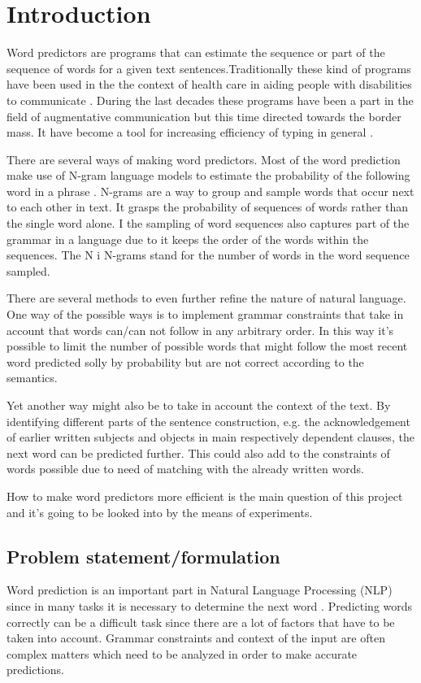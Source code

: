 \section{Introduction}

Word predictors are programs that can estimate the sequence or part of the sequence of words for a given text sentences.Traditionally these kind of programs have been used in the the context of health care in aiding people with disabilities to communicate \cite{Lesher99effectsof}. During the last decades these programs have been a part in the field of augmentative communication but this time directed towards the border mass. It have become a tool for increasing efficiency of typing in general \cite{Lesher99effectsof}. 

There are several ways of making word predictors. Most of the word prediction make use of N-gram language models to estimate the probability of the following word in a phrase \cite{Wandmacher}. N-grams are a way to group and sample words that occur next to each other in text. It grasps the probability of sequences of words rather than the single word alone. I the sampling of word sequences also captures part of the grammar in a language due to it keeps the order of the words within the sequences. The N i N-grams stand for the number of words in the word sequence sampled.

There are several methods to even further refine the nature of natural language. 
One way of the possible ways is to implement grammar constraints that take in account that words can/can not follow in any arbitrary order. In this way it’s possible to limit the number of possible words that might follow the most recent word predicted solly by probability but are not correct according to the semantics.

Yet another way might also be to take in account the context of the text. By identifying different parts of the sentence construction, e.g. the acknowledgement of earlier written subjects and objects in main respectively dependent clauses, the next word can be predicted further. This could also add to the constraints of words possible due to need of matching with the already written words. 
 
How to make word predictors more efficient is the main question of this project and it’s going to be looked into by the means of experiments. 

\subsection{Problem statement/formulation}
Word prediction is an important part in Natural Language Processing (NLP) since in many tasks it is necessary to determine the next word  \cite{DBLP:journals/corr/cs-CL-0009027}.  Predicting words correctly can be a difficult task since there are a lot of factors that have to be taken into account. Grammar constraints and context of the input are often complex matters which need to be analyzed in order to make accurate predictions.
 
